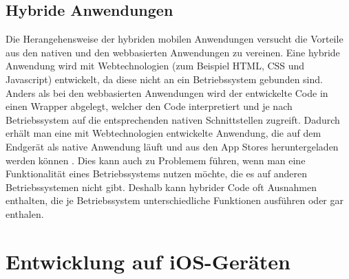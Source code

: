 \subsection{Hybride Anwendungen}
Die Herangehensweise der hybriden mobilen Anwendungen versucht die Vorteile aus den nativen und den webbasierten Anwendungen zu vereinen. Eine hybride Anwendung wird mit Webtechnologien (zum Beispiel HTML, CSS und Javascript) entwickelt, da diese nicht an ein Betriebssystem gebunden sind. Anders als bei den webbasierten Anwendungen wird der entwickelte Code in einen Wrapper abgelegt, welcher den Code interpretiert und je nach Betriebssystem auf die entsprechenden nativen Schnittstellen zugreift. Dadurch erhält man eine mit Webtechnologien entwickelte Anwendung, die auf dem Endgerät als native Anwendung läuft und aus den App Stores heruntergeladen werden können \parencite{HUY2017}. Dies kann auch zu Problemem führen, wenn man eine Funktionalität eines Betriebssystems nutzen möchte, die es auf anderen Betriebssystemen nicht gibt. Deshalb kann hybrider Code oft Ausnahmen enthalten, die je Betriebssystem unterschiedliche Funktionen ausführen oder gar enthalen.

\section{Entwicklung auf iOS-Geräten}
